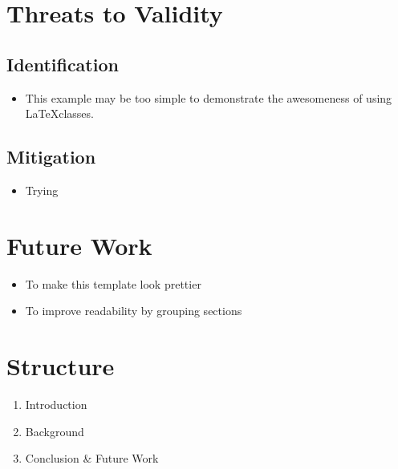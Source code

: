 \documentclass{paper_proposal}
\begin{document}
\section{Threats to Validity}

\subsection{Identification}
\begin{itemize}
  \item This example may be too simple to demonstrate the awesomeness of using
    \LaTeX classes.
\end{itemize}

\subsection{Mitigation}
\begin{itemize}
  \item Trying 
\end{itemize}

\section{Future Work}
\begin{itemize}
  \item To make this template look prettier
  \item To improve readability by grouping sections
\end{itemize}

\section{Structure}

\begin{enumerate}
  \item Introduction
  \item Background
  \item Conclusion \& Future Work
\end{enumerate}
\end{document}
